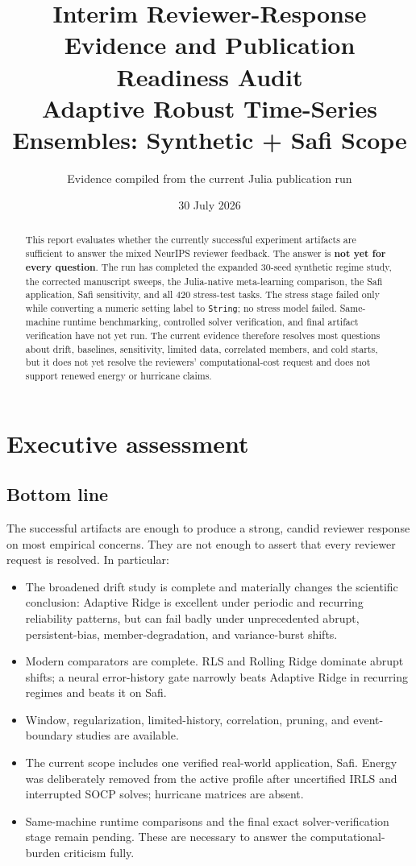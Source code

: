\documentclass[10pt]{report}
\title{Interim Reviewer-Response Evidence and Publication Readiness Audit\\[0.5em]\large Adaptive Robust Time-Series Ensembles: Synthetic + Safi Scope}
\author{Evidence compiled from the current Julia publication run}
\date{30 July 2026}
\begin{document}
\maketitle
\begin{abstract}
This report evaluates whether the currently successful experiment artifacts are sufficient to answer the mixed NeurIPS reviewer feedback. The answer is \textbf{not yet for every question}. The run has completed the expanded 30-seed synthetic regime study, the corrected manuscript sweeps, the Julia-native meta-learning comparison, the Safi application, Safi sensitivity, and all 420 stress-test tasks. The stress stage failed only while converting a numeric setting label to \texttt{String}; no stress model failed. Same-machine runtime benchmarking, controlled solver verification, and final artifact verification have not yet run. The current evidence therefore resolves most questions about drift, baselines, sensitivity, limited data, correlated members, and cold starts, but it does not yet resolve the reviewers' computational-cost request and does not support renewed energy or hurricane claims.
\end{abstract}
\tableofcontents

\chapter{Executive assessment}
\section{Bottom line}
The successful artifacts are enough to produce a strong, candid reviewer response on most empirical concerns. They are not enough to assert that every reviewer request is resolved. In particular:
\begin{itemize}
\item The broadened drift study is complete and materially changes the scientific conclusion: Adaptive Ridge is excellent under periodic and recurring reliability patterns, but can fail badly under unprecedented abrupt, persistent-bias, member-degradation, and variance-burst shifts.
\item Modern comparators are complete. RLS and Rolling Ridge dominate abrupt shifts; a neural error-history gate narrowly beats Adaptive Ridge in recurring regimes and beats it on Safi.
\item Window, regularization, limited-history, correlation, pruning, and event-boundary studies are available.
\item The current scope includes one verified real-world application, Safi. Energy was deliberately removed from the active profile after uncertified IRLS and interrupted SOCP solves; hurricane matrices are absent.
\item Same-machine runtime comparisons and the final exact solver-verification stage remain pending. These are necessary to answer the computational-burden criticism fully.
\end{itemize}
\end{document}
